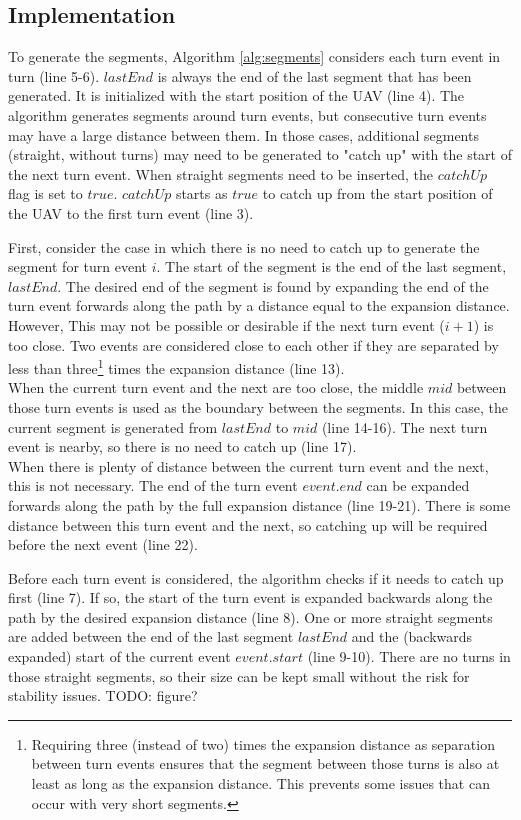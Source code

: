 \subsection{Implementation}
To generate the segments, Algorithm \ref{alg:segments} considers each turn event in turn (line 5-6). $lastEnd$ is always the end of the last segment that has been generated. It is initialized with the start position of the UAV (line 4). The algorithm generates segments around turn events, but consecutive turn events may have a large distance between them. In those cases, additional segments (straight, without turns) may need to be generated to "catch up" with the start of the next turn event. When straight segments need to be inserted, the $catchUp$ flag is set to $true$. $catchUp$ starts as $true$ to catch up from the start position of the UAV to the first turn event (line 3).
\par
First, consider the case in which there is no need to catch up to generate the segment for turn event $i$. The start of the segment is the end of the last segment, $lastEnd$. The desired end of the segment is found by expanding the end of the turn event forwards along the path by a distance equal to the expansion distance. However, This may not be possible or desirable if the next turn event ($i+1$) is too close. Two events are considered close to each other if they are separated by less than three\footnote{Requiring three (instead of two) times the expansion distance as separation between turn events ensures that the segment between those turns is also at least as long as the expansion distance. This prevents some issues that can occur with very short segments.} times the expansion distance (line 13). \\
When the current turn event and the next are too close, the middle $mid$ between those turn events is used as the boundary between the segments. In this case, the current segment is generated from $lastEnd$ to $mid$ (line 14-16). The next turn event is nearby, so there is no need to catch up (line 17). \\
When there is plenty of distance between the current turn event and the next, this is not necessary. The end of the turn event $event.end$ can be expanded forwards along the path by the full expansion distance (line 19-21). There is some distance between this turn event and the next, so catching up will be required before the next event (line 22). \\
\par
Before each turn event is considered, the algorithm checks if it needs to catch up first (line 7). If so, the start of the turn event is expanded backwards along the path by the desired expansion distance (line 8). One or more straight segments are added between the end of the last segment $lastEnd$ and the (backwards expanded) start of the current event $event.start$ (line 9-10). There are no turns in those straight segments, so their size can be kept small without the risk for stability issues. TODO: figure?
